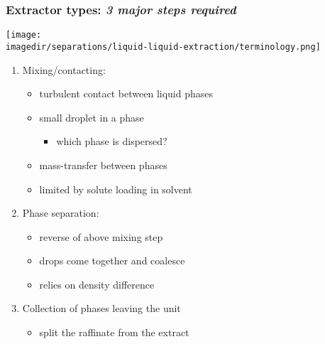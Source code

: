 \begin{frame}\frametitle{Extractor types: \emph{3 major steps required}}
	\begin{center}
		\texttt{[image: \\imagedir/separations/liquid-liquid-extraction/terminology.png]}
	\end{center}
	\begin{enumerate}
		\item	Mixing/contacting:
		 	\begin{itemize}
		 		\item	turbulent contact between liquid phases
		 		\item	small droplet {\color{purple}{dispersion}} in a {\color{purple}{continuous}} phase
				\begin{itemize}
					\item	which phase is dispersed?
				\end{itemize}
		 		\item	mass-transfer between phases
		 		\item	limited by solute loading in solvent
		 	\end{itemize}
		\item	Phase separation:
			\begin{itemize}
				\item	reverse of above mixing step
				\item	drops come together and coalesce
				\item	relies on density difference
			\end{itemize}
		\item	Collection of phases leaving the unit
			\begin{itemize}
				\item	split the raffinate from the extract
			\end{itemize}
	\end{enumerate}
\end{frame}

